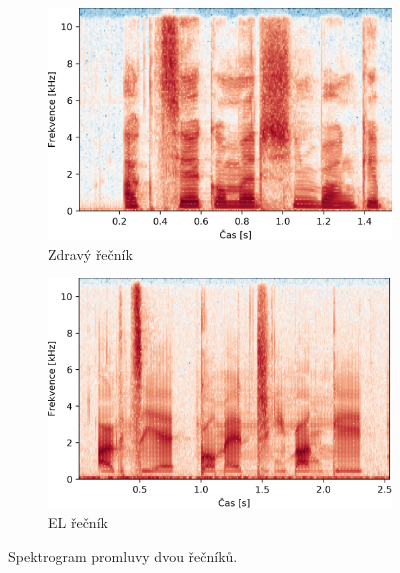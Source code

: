 
\begin{figure}[htpb]
  \centering
  \begin{subfigure}[b]{0.4\textwidth}
    \includegraphics[width=\textwidth]{./parts/ch5-construction/img/spectrogram_normal.png}
    \caption{Zdravý řečník}
    \label{fig:construction:spectrogram:normal}
  \end{subfigure}
  \begin{subfigure}[b]{0.4\textwidth}
    \includegraphics[width=\textwidth]{./parts/ch5-construction/img/spectrogram_el.png}
    \caption{EL řečník}
    \label{fig:construction:spectrogram:el}
  \end{subfigure}
  \caption{Spektrogram promluvy  dvou řečníků.}
  \label{fig:construction:spectrogram}
\end{figure}

